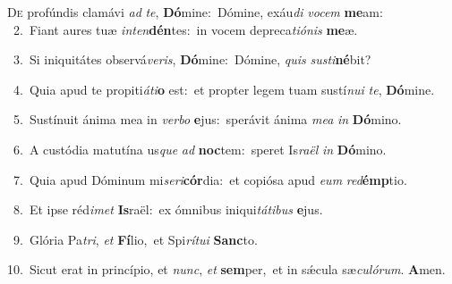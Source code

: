 \lettrine{\initial\textcolor{\initialcolor}{D}}{e} profúndis clamávi \textit{ad} \textit{te}\-, \textbf{Dó}\-mine:~\star Dómine, exáu\textit{di} \textit{vo}\-\textit{cem} \textbf{me}\-am:\\
{\numbfont\textcolor{\numbcolor}{~2.}}~Fiant aures tuæ \textit{in}\-\textit{ten}\textbf{dén}tes:~\star in vocem depreca\-\textit{ti}\-\textit{ó}\textit{nis} \textbf{me}\-æ.\par
{\numbfont\textcolor{\numbcolor}{~3.}}~Si iniquitátes observá\-\textit{ve}\-\textit{ris}, \textbf{Dó}\-mine:~\star Dómine, \textit{quis} \textit{sus}\-\textit{ti}\textbf{né}bit?\par
{\numbfont\textcolor{\numbcolor}{~4.}}~Quia apud te propiti\-\textit{á}\-\textit{ti}\textbf{o} est:~\star et propter legem tuam sustí\-\textit{nu}\-\textit{i} \textit{te}\-, \textbf{Dó}\-mine.\par
{\numbfont\textcolor{\numbcolor}{~5.}}~Sustínuit ánima mea in \textit{ver}\-\textit{bo} \textbf{e}\-jus:~\star sperávit ánima \textit{me}\-\textit{a} \textit{in} \textbf{Dó}\-mino.\par
{\numbfont\textcolor{\numbcolor}{~6.}}~A custódia matutína us\textit{que} \textit{ad} \textbf{noc}\-tem:~\star speret Is\-\textit{ra}\-\textit{ël} \textit{in} \textbf{Dó}\-mino.\par
{\numbfont\textcolor{\numbcolor}{~7.}}~Quia apud Dóminum mi\-\textit{se}\-\textit{ri}\textbf{cór}dia:~\star et copiósa apud \textit{e}\-\textit{um} \textit{red}\-\textbf{émp}tio.\par
{\numbfont\textcolor{\numbcolor}{~8.}}~Et ipse réd\-\textit{i}\-\textit{met} \textbf{Is}\-raël:~\star ex ómnibus iniqui\-\textit{tá}\-\textit{ti}\textit{bus} \textbf{e}\-jus.\par
{\numbfont\textcolor{\numbcolor}{~9.}}~Glória Pa\-\textit{tri}\-, \textit{et} \textbf{Fí}\-lio,~\star et Spi\-\textit{rí}\-\textit{tu}\textit{i} \textbf{Sanc}\-to.\par
{\numbfont\textcolor{\numbcolor}{10.}}~Sicut erat in princípio, et \textit{nunc}\-, \textit{et} \textbf{sem}\-per,~\star et in sǽcula sæ\-\textit{cu}\-\textit{ló}\textit{rum}. \textbf{A}\-men.\par
